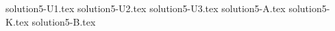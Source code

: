 \documentclass{article}
\begin{document}
{solution5-U1.tex}
{solution5-U2.tex}
{solution5-U3.tex}
{solution5-A.tex}
{solution5-K.tex}
{solution5-B.tex}
\end{document}
